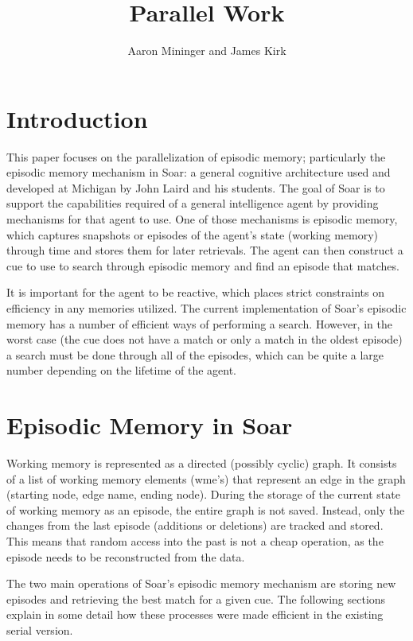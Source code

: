 \documentclass[11pt]{article} %
\title{Parallel Work}
\author{Aaron Mininger and James Kirk}
\begin{document}
\maketitle

\section{Introduction}
This paper focuses on the parallelization of episodic memory; particularly the
episodic memory mechanism in Soar: a general cognitive architecture used and
developed at Michigan by John Laird and his students. The goal of Soar is to
support the capabilities required of a general intelligence agent by providing
mechanisms for that agent to use. One of those mechanisms is episodic memory,
which captures snapshots or episodes of the agent’s state (working memory)
through time and stores them for later retrievals. The agent can then construct
a cue to use to search through episodic memory and find an episode that matches.

It is important for the agent to be reactive, which places strict constraints on
efficiency in any memories utilized. The current implementation of Soar’s
episodic memory has a number of efficient ways of performing a search. However,
in the worst case (the cue does not have a match or only a match in the oldest
episode) a search must be done through all of the episodes, which can be quite a
large number depending on the lifetime of the agent.

\section{Episodic Memory in Soar}
Working memory is represented as a directed (possibly cyclic) graph. It consists
of a list of working memory elements (wme’s) that represent an edge in the graph
(starting node, edge name, ending node). During the storage of the current state
of working memory as an episode, the entire graph is not saved. Instead, only
the changes from the last episode (additions or deletions) are tracked and
stored. This means that random access into the past is not a cheap operation, as
the episode needs to be reconstructed from the data.

The two main operations of Soar’s episodic memory mechanism are storing new
episodes and retrieving the best match for a given cue. The following sections
explain in some detail how these processes were made efficient in the existing
serial version.
\end{document}
